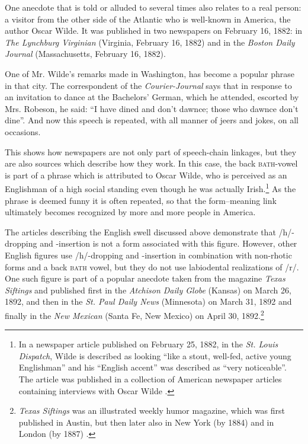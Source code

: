 One anecdote that is told or alluded to several times also relates to a real person: a visitor from the other side of the Atlantic who is well-known in America, the author Oscar Wilde. It was published in two newspapers on February 16, 1882: in \emph{The Lynchburg Virginian} (Virginia, February 16, 1882) and in the \emph{Boston Daily Journal} (Massachusetts, February 16, 1882).

\begin{ipquote}
One of Mr. Wilde's remarks made in Washington, has become a popular phrase in that city. The correspondent of the \textit{Courier-Journal} says that in response to an invitation to dance at the Bachelors' German, which he attended, escorted by Mrs. Robeson, he said: “I have dined and don't dawnce; those who dawnce don't dine”. And now this speech is repeated, with all manner of jeers and jokes, on all occasions.
\end{ipquote}

This shows how newspapers are not only part of speech-chain linkages, but they are also sources which describe how they work. In this case, the back \textsc{bath}{}-vowel is part of a phrase which is attributed to Oscar Wilde, who is perceived as an Englishman of a high social standing even though he was actually Irish.\footnote{In a newspaper article published on February 25, 1882, in the \emph{St. Louis Dispatch}, Wilde is described as looking “like a stout, well-fed, active young Englishman” and his “English accent” was described as “very noticeable”. The article was published in a collection of American newspaper articles containing interviews with Oscar Wilde \citep{Hofer2010}.} As the phrase is deemed funny it is often repeated, so that the form–meaning link ultimately becomes recognized by more and more people in America.

The articles describing the English swell discussed above demonstrate that /h/-dropping and -insertion is not a form associated with this figure. However, other English figures use /h/-dropping and -insertion in combination with non-rhotic forms and a back \textsc{bath} vowel, but they do not use labiodental realizations of /r/. One such figure is part of a popular anecdote taken from the magazine \emph{Texas Siftings} and published first in the \emph{Atchison Daily Globe} (Kansas) on March 26, 1892, and then in the \emph{St. Paul Daily News} (Minnesota) on March 31, 1892 and finally in the \emph{New Mexican} (Santa Fe, New Mexico) on April 30, 1892.\footnote{\emph{Texas Siftings} was an illustrated weekly humor magazine, which was first published in Austin, but then later also in New York (by 1884) and in London (by 1887) \citep[412]{Kelsey2005}.}

